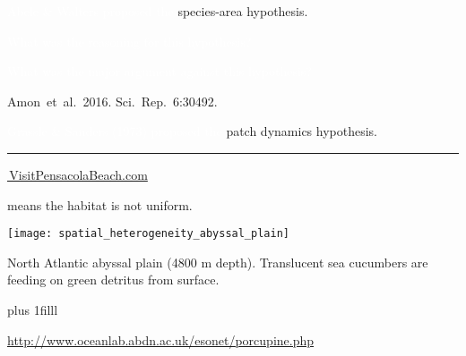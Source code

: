 \documentclass[t]{beamer}
\begin{document}
{
\begin{frame}[t]{\textcolor{white}{Abele \& Walters proposed the }\textcolor{orange4}{species-area hypothesis.} }

	\hangpara \textcolor{white}{What was the reasoning for this hypothesis?}

	\hangpara \textcolor{white}{What was the major argument against this hypothesis?}
	
	\tinyfill Amon~et~al.~2016. Sci.\ Rep.\ 6:30492. 

\end{frame}
}

%
%
%

{
\begin{frame}[t]{\textcolor{white}{Grassle \& Sanders (1973) proposed the} \textcolor{orange4}{{patch dynamics hypothesis.}}}

\vspace{-1\baselineskip}

\textcolor{gray}{\rule{\textwidth}{0.4pt}}


	

\tinyfill \href{https://www.visitpensacolabeach.com/ecotrail/fish/bottom-fish/}{\textcopyright\,VisitPensacolaBeach.com}
\end{frame}
}

%
%
%	
%

\begin{frame}[t]{ means the habitat is not uniform.}

	{\centering
	\texttt{[image: spatial\_heterogeneity\_abyssal\_plain]}\par}

	\vspace*{-\baselineskip}\hangpara North Atlantic abyssal plain (4800 m depth). Translucent sea cucumbers are feeding on green detritus from surface.

\vskip0pt plus 1filll

\hfill\tiny\url{http://www.oceanlab.abdn.ac.uk/esonet/porcupine.php}
\end{frame}
\end{document}
